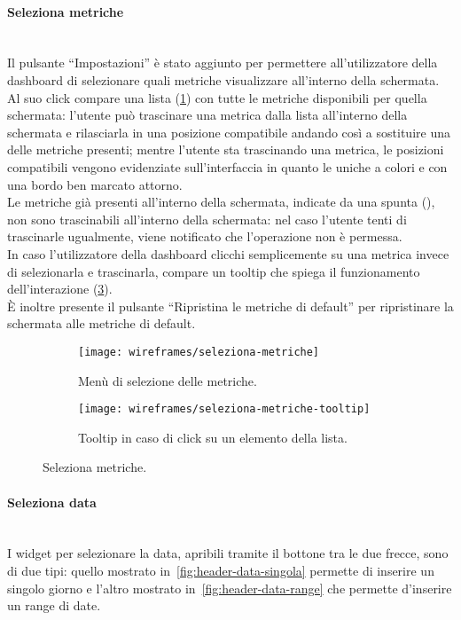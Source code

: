 \documentclass[../../../main.tex]{subfiles}
\begin{document}
\paragraph{Seleziona metriche}\mbox{}\\
Il pulsante ``Impostazioni'' è stato aggiunto per permettere all'utilizzatore della dashboard di selezionare quali metriche visualizzare all'interno della schermata. Al suo click compare una lista (\ref{fig:seleziona-metriche}) con tutte le metriche disponibili per quella schermata: l'utente può trascinare una metrica dalla lista all'interno della schermata e rilasciarla in una posizione compatibile andando così a sostituire una delle metriche presenti; mentre l'utente sta trascinando una metrica, le posizioni compatibili vengono evidenziate sull'interfaccia in quanto le uniche a colori e con una bordo ben marcato attorno.\\
Le metriche già presenti all'interno della schermata, indicate da una spunta (\checkmark), non sono trascinabili all'interno della schermata: nel caso l'utente tenti di trascinarle ugualmente, viene notificato che l'operazione non è permessa.\\
In caso l'utilizzatore della dashboard clicchi semplicemente su una metrica invece di selezionarla e trascinarla, compare un tooltip che spiega il funzionamento dell'interazione (\ref{fig:seleziona-metriche-tooltip}).\\
\`E inoltre presente il pulsante ``Ripristina le metriche di default'' per ripristinare la schermata alle metriche di default.

\begin{figure}[H]
    \begin{subfigure}[b]{0.5\textwidth}
        \centering
        \texttt{[image: wireframes/seleziona-metriche]}
        \caption{Menù di selezione delle metriche.}
        \label{fig:seleziona-metriche}
    \end{subfigure}
\hfill
    \begin{subfigure}[b]{0.5\textwidth}
        \centering
        \texttt{[image: wireframes/seleziona-metriche-tooltip]}
        \caption{Tooltip in caso di click su un elemento della lista.}
        \label{fig:seleziona-metriche-tooltip}
    \end{subfigure}
    \caption{Seleziona metriche.}
\end{figure}


\paragraph{Seleziona data}\mbox{}\\
I widget per selezionare la data, apribili tramite il bottone tra le due frecce, sono di due tipi: quello mostrato in~\ref{fig:header-data-singola} permette di inserire un singolo giorno e l'altro mostrato in~\ref{fig:header-data-range} che permette d'inserire un range di date.\\
\end{document}
